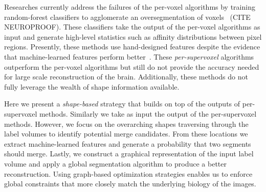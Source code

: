 Researches currently address the failures of the per-voxel algorithms by training random-forest classifiers to agglomerate an oversegmentation of voxels~\cite{nunez2014graph} (CITE NEUROPROOF). 
These classifiers take the output of the per-voxel algorithms as input and generate high-level statistics such as affinity distributions between pixel regions. 
Presently, these methods use hand-designed features despite the evidence that machine-learned features perform better~\cite{bogovic2013learned}. 
These \textit{per-supervoxel} algorithms outperform the per-voxel algorithms but still do not provide the accuracy needed for large scale reconstruction of the brain.
Additionally, these methods do not fully leverage the wealth of shape information available. 

Here we present a \textit{shape-based} strategy that builds on top of the outputs of per-supervoxel methods. 
Similarly we take as input the output of the per-supervoxel methods. 
However, we focus on the overarching shapes traversing through the label volumes to identify potential merge candidates. 
From these locations we extract machine-learned features and generate a probability that two segments should merge. 
Lastly, we construct a graphical representation of the input label volume and apply a global segmentation algorithm to produce a better reconstruction.
Using graph-based optimization strategies enables us to enforce global constraints that more closely match the underlying biology of the images.